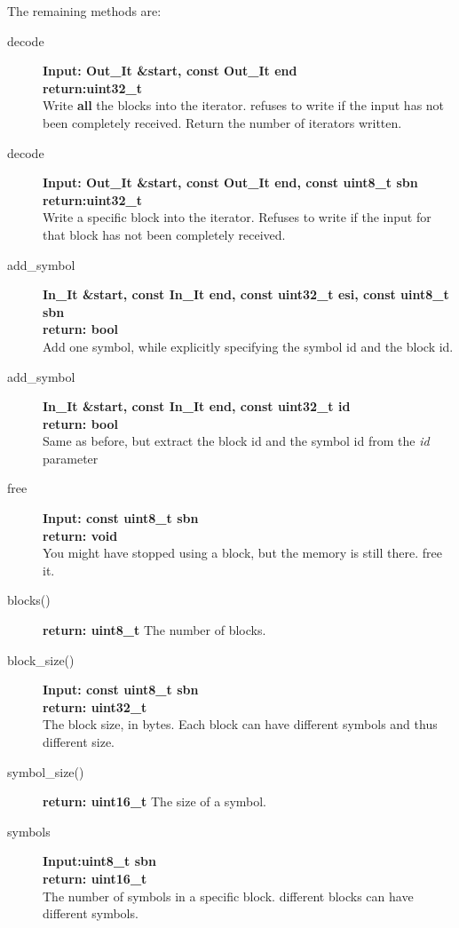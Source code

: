 \documentclass[11pt,a4paper]{refart}
\begin{document}
The remaining methods are:
\begin{description}
\item[decode]\textbf{Input: Out\_It \&start, const Out\_It end}\\
\textbf{return:uint32\_t}\\
Write \textbf{all} the blocks into the iterator. refuses to write if the input has not been completely received. Return the number of iterators written.

\item[decode]\textbf{Input: Out\_It \&start, const Out\_It end, const uint8\_t sbn}\\
\textbf{return:uint32\_t}\\
Write a specific block into the iterator. Refuses to write if the input for that block has not been completely received.

\item[add\_symbol]\textbf{In\_It \&start, const In\_It end, const uint32\_t esi, const uint8\_t sbn}\\
\textbf{return: bool}\\
Add one symbol, while explicitly specifying the symbol id and the block id.

\item[add\_symbol]\textbf{In\_It \&start, const In\_It end, const uint32\_t id}\\
\textbf{return: bool}\\
Same as before, but extract the block id and the symbol id from the \textit{id} parameter

\item[free]\textbf{Input: const uint8\_t sbn}\\
\textbf{return: void}\\
You might have stopped using a block, but the memory is still there. free it.

\item[blocks()] \textbf{return: uint8\_t} The number of blocks.

\item[block\_size()] \textbf{Input: const uint8\_t sbn}\\
\textbf{return: uint32\_t}\\
The block size, in bytes. Each block can have different symbols and thus different size.

\item[symbol\_size()] \textbf{return: uint16\_t} The size of a symbol.

\item[symbols] \textbf{Input:uint8\_t sbn}\\
\textbf{return: uint16\_t}\\
The number of symbols in a specific block. different blocks can have different symbols.
\end{description}


\printindex
\end{document}
